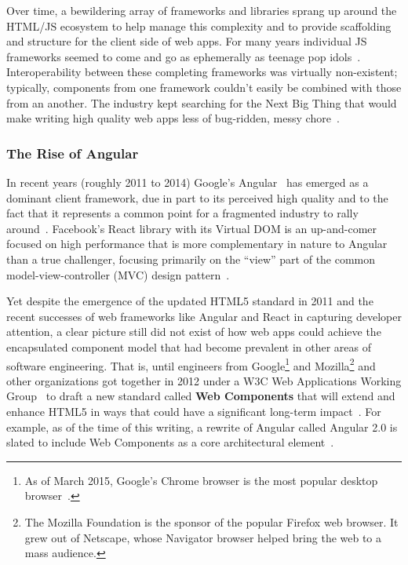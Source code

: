 Over time, a bewildering array of frameworks and libraries sprang up around the HTML/JS ecosystem to help manage this complexity and to provide scaffolding and structure for the client side of web apps.
For many years individual JS frameworks seemed to come and go as ephemerally as teenage pop idols~\cite{allenpike2015}. 
Interoperability between these completing frameworks was virtually non-existent; 
typically, components from one framework couldn't easily be combined with those from an another.
The industry kept searching for the Next Big Thing that would make writing high quality web apps less of bug-ridden, messy chore~\cite{allenpike2015}. 

\subsubsection{The Rise of Angular}
In recent years (roughly 2011 to 2014) Google's Angular~\cite{googledevelopers2015-b}
has emerged as a dominant client framework, 
due in part to its perceived high quality and to the fact that it represents a common point for a fragmented industry to rally around~\cite{dickey2014}.
Facebook's React library with its Virtual DOM is an up-and-comer focused on high performance that is more complementary in nature to Angular than a true challenger, 
focusing primarily on the ``view'' part of the common 
model-view-controller (MVC) 
design pattern~\cite{reactcontributors2015}.

Yet despite the emergence of the updated HTML5 standard in 2011 and the recent successes of web frameworks like Angular and React in capturing developer attention, 
a clear picture still did not exist of how web apps could achieve the encapsulated component model that had become prevalent in other areas of software engineering.
That is, until engineers from Google\footnote{
As of March 2015, Google's Chrome browser is the most popular desktop browser~\cite{zachte2015}.}
and Mozilla\footnote{
The Mozilla Foundation is the sponsor of the popular Firefox web browser. It grew out of Netscape, whose Navigator browser helped bring the web to a mass audience.}
and other organizations got together in 2012 under a W3C Web Applications Working Group~\cite{w3c2015} 
to draft a new standard called \textbf{Web Components} that will extend and enhance HTML5 in ways that could have a significant long-term impact~\cite{yveslafon2015}. 
For example, as of the time of this writing, a rewrite of Angular called Angular 2.0 is slated to include Web Components as a core architectural element~\cite{santiagoesteva2015}.

